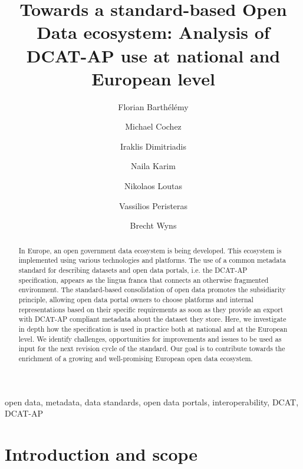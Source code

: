 \documentclass[<options>]{elsarticle}
\begin{document}
\begin{frontmatter}

\title{Towards a standard-based Open Data ecosystem: Analysis of DCAT-AP use at national and European level}

\author[1]{Florian Barth\'el\'emy}
\author[2]{Michael Cochez}
\author[2]{Iraklis Dimitriadis}
\author[2]{Naila Karim}
\author[1]{Nikolaos Loutas}
\author[3]{Vassilios Peristeras}
\author[1]{Brecht Wyns}

\address[1]{PwC Belgium}
\address[2]{Fraunhofer/FIT, Germany}
\address[3]{International Hellenic University, Greece}

\begin{abstract}
In Europe, an open government data ecosystem is being developed. This ecosystem is implemented using various technologies and platforms. The use of a common metadata standard for describing datasets and open data portals, i.e. the DCAT-AP specification, appears as the lingua franca that connects an otherwise fragmented environment. The standard-based consolidation of open data promotes the subsidiarity principle, allowing open data portal owners to choose platforms and internal representations based on their specific requirements as soon as they provide an export with DCAT-AP compliant metadata about the dataset they store. Here, we investigate in depth how the specification is used in practice both at national and at the European level. We identify challenges, opportunities for improvements and issues to be used as input for the next revision cycle of the standard. Our goal is to contribute towards the enrichment of a growing and well-promising European open data ecosystem.
\end{abstract}

\begin{keyword}
open data, metadata, data standards, open data portals, interoperability, DCAT, DCAT-AP
\end{keyword}

\end{frontmatter}

\linenumbers

\section{Introduction and scope}
\end{document}

